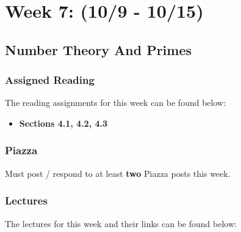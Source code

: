 \clearpage
\chapter{Week 7: (10/9 - 10/15)}

\section{Number Theory And Primes}

\subsection{Assigned Reading}

The reading assignments for this week can be found below:

\begin{itemize}
    \item \textbf{Sections 4.1, 4.2, 4.3}
\end{itemize}

\subsection{Piazza}

Must post / respond to at least \textbf{two} Piazza posts this week.  

\subsection{Lectures}

The lectures for this week and their links can be found below:

